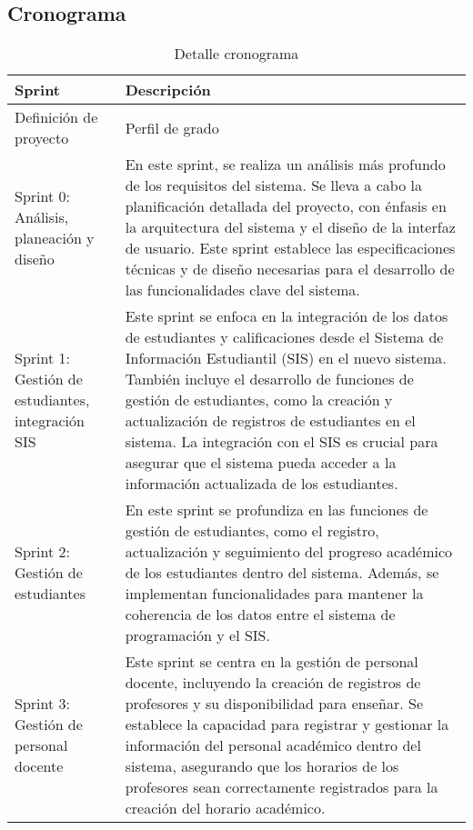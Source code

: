 \subsection{Cronograma}


\begin{longtable}{p{3in}|p{3in}}
\caption{Detalle cronograma} \label{tab:chronogram} \\
\hline
\endfirsthead
\hline
\textbf{Sprint} & \textbf{Descripción} \\
\hline
\endhead
\hline
\endfoot

\hline
Definición de proyecto & Perfil de grado \\
\hline

Sprint 0: Análisis, planeación y diseño & 
En este sprint, se realiza un análisis más profundo de los requisitos del sistema.
Se lleva a cabo la planificación detallada del proyecto, con énfasis en la arquitectura del sistema y el diseño de la interfaz de usuario. Este sprint establece las especificaciones técnicas y de diseño necesarias para el desarrollo de las funcionalidades clave del sistema. \\
\hline

Sprint 1: Gestión de estudiantes, integración SIS & 
Este sprint se enfoca en la integración de los datos de estudiantes y calificaciones desde el Sistema de Información Estudiantil (SIS) en el nuevo sistema.
También incluye el desarrollo de funciones de gestión de estudiantes, como la creación y actualización de registros de estudiantes en el sistema. La integración con el SIS es crucial para asegurar que el sistema pueda acceder a la información actualizada de los estudiantes. \\
\hline

Sprint 2: Gestión de estudiantes & 
En este sprint se profundiza en las funciones de gestión de estudiantes, como el registro, actualización y seguimiento del progreso académico de los estudiantes dentro del sistema.
Además, se implementan funcionalidades para mantener la coherencia de los datos entre el sistema de programación y el SIS. \\
\hline

Sprint 3: Gestión de personal docente & 
Este sprint se centra en la gestión de personal docente, incluyendo la creación de registros de profesores y su disponibilidad para enseñar.
Se establece la capacidad para registrar y gestionar la información del personal académico dentro del sistema, asegurando que los horarios de los profesores sean correctamente registrados para la creación del horario académico. \\
\hline


\end{longtable}
